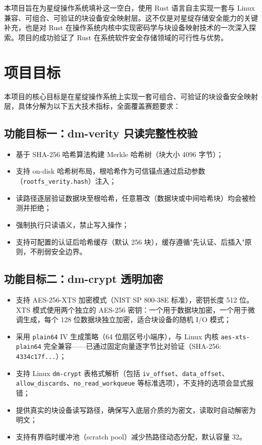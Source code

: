 本项目旨在为星绽操作系统填补这一空白，使用 Rust 语言自主实现一套与 Linux 兼容、可组合、可验证的块设备安全映射层。这不仅是对星绽存储安全能力的关键补充，也是对 Rust 在操作系统内核中实现密码学与块设备映射技术的一次深入探索。项目的成功验证了 Rust 在系统软件安全存储领域的可行性与优势。

\section{项目目标}

本项目的核心目标是在星绽操作系统上实现一套可组合、可验证的块设备安全映射层，具体分解为以下五大技术指标，全面覆盖赛题要求：

\subsection{功能目标一：dm-verity 只读完整性校验}

\begin{itemize}
    \item 基于 SHA-256 哈希算法构建 Merkle 哈希树（块大小 4096 字节）；
    \item 支持 on-disk 哈希树布局，根哈希作为可信锚点通过启动参数（\texttt{rootfs\_verity.hash}）注入；
    \item 读路径逐层验证数据块至根哈希，任意篡改（数据块或中间哈希块）均会被检测并拒绝；
    \item 强制执行只读语义，禁止写入操作；
    \item 支持可配置的认证后哈希缓存（默认 256 块），缓存遵循"先认证、后插入"原则，不削弱安全边界。
\end{itemize}

\subsection{功能目标二：dm-crypt 透明加密}

\begin{itemize}
    \item 支持 AES-256-XTS 加密模式（NIST SP 800-38E 标准），密钥长度 512 位。XTS 模式使用两个独立的 AES-256 密钥：一个用于数据块加密，一个用于微调生成，每个 128 位数据块独立加密，适合块设备的随机 I/O 模式；
    \item 采用 \texttt{plain64} IV 生成策略（64 位扇区号小端序），与 Linux 内核 \texttt{aes-xts-plain64} 完全兼容——已通过固定向量逐字节比对验证（SHA-256: \texttt{4334c17f...}）；
    \item 支持 Linux \texttt{dm-crypt} 表格式解析（包括 \texttt{iv\_offset}、\texttt{data\_offset}、\texttt{allow\_discards}、\texttt{no\_read\_workqueue} 等标准选项），不支持的选项会显式报错；
    \item 提供真实的块设备读写路径，确保写入底层介质的为密文，读取时自动解密为明文；
    \item 支持有界临时缓冲池（scratch pool）减少热路径动态分配，默认容量 32。
\end{itemize}

